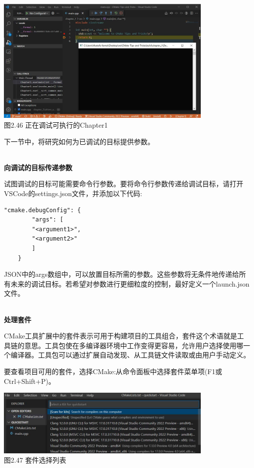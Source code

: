 \begin{center}
\includegraphics[width=0.8\textwidth]{content/1/chapter2/images/46.jpg}\\
图2.46 正在调试可执行的Chapter1
\end{center}

下一节中，将研究如何为已调试的目标提供参数。

\hspace*{\fill} \\ %
\noindent
\textbf{向调试的目标传递参数}

试图调试的目标可能需要命令行参数。要将命令行参数传递给调试目标，请打开VSCode的settings.json文件，并添加以下代码:

\begin{lstlisting}[style=styleCMake]
"cmake.debugConfig": {
		"args": [
		"<argument1>",
		"<argument2>"
		]
	}
\end{lstlisting}

JSON中的args数组中，可以放置目标所需的参数。这些参数将无条件地传递给所有未来的调试目标。若希望对参数进行更细粒度的控制，最好定义一个launch.json文件。

\hspace*{\fill} \\ %
\noindent
\textbf{处理套件}

CMake工具扩展中的套件表示可用于构建项目的工具组合，套件这个术语就是工具链的意思。工具包使在多编译器环境中工作变得更容易，允许用户选择使用哪一个编译器。工具包可以通过扩展自动发现、从工具链文件读取或由用户手动定义。

要查看项目可用的套件，选择CMake:从命令面板中选择套件菜单项(F1或Ctrl+Shift+P)。

\begin{center}
\includegraphics[width=0.8\textwidth]{content/1/chapter2/images/47.jpg}\\
图2.47 套件选择列表
\end{center}


